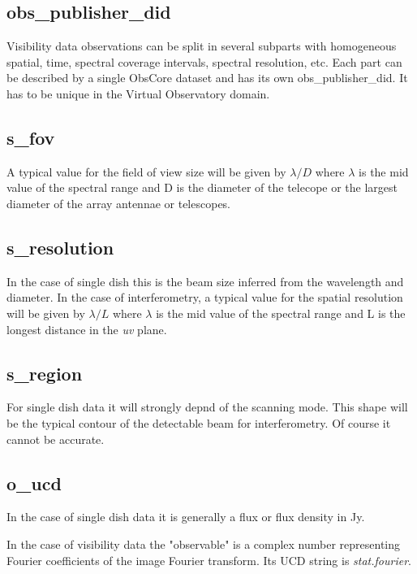 \documentclass[11pt,a4paper]{ivoa}
\begin{document}
\subsection{obs\_publisher\_did}

Visibility data observations can be split in several subparts with homogeneous spatial, 
time, spectral coverage intervals, spectral resolution, etc. Each part can be described by 
a single ObsCore dataset and has its own obs\_publisher\_did. It has to be unique in the 
Virtual Observatory domain.

\subsection{s\_fov}
\label{sec:fov}

A typical value for the field of view size will be given by $\lambda / D$ where $\lambda$ 
is the mid value of the spectral range and D is the  diameter of the telecope or the largest diameter of the array antennae or 
telescopes.
 
\subsection{s\_resolution}
\label{sec:res}
In the case of single dish this is the beam size inferred from the wavelength and diameter. 
In the case of interferometry, a typical value for the spatial resolution will be given by $\lambda / L$ where $\lambda$ 
is the mid value of the spectral range and L is the longest distance in the \emph{uv} plane.


\subsection{s\_region}

For single dish data it will strongly depnd of the scanning mode. 
This shape will be the typical contour of the detectable beam for interferometry. Of course it cannot be accurate. 

\subsection{o\_ucd}

In the case of single dish data it is generally a flux or flux density in Jy.

In the case of visibility data the "observable" is a complex number representing Fourier 
coefficients of the image Fourier transform. Its UCD string is \emph{stat.fourier}. 
\end{document}
